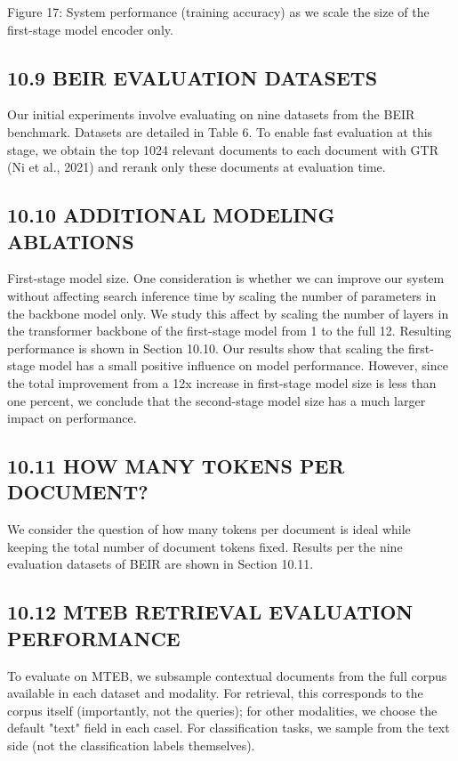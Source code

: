 \begin{tabular}
{Figure 17: System performance (training accuracy) as we scale the size of the first-stage model encoder only.
\subsection*{10.9 BEIR EVALUATION DATASETS}
Our initial experiments involve evaluating on nine datasets from the BEIR benchmark. Datasets are detailed in Table 6. To enable fast evaluation at this stage, we obtain the top 1024 relevant documents to each document with GTR (Ni et al., 2021) and rerank only these documents at evaluation time.
\subsection*{10.10 ADDITIONAL MODELING ABLATIONS}
First-stage model size. One consideration is whether we can improve our system without affecting search inference time by scaling the number of parameters in the backbone model only. We study this affect by scaling the number of layers in the transformer backbone of the first-stage model from 1 to the full 12. Resulting performance is shown in Section 10.10.
Our results show that scaling the first-stage model has a small positive influence on model performance. However, since the total improvement from a 12x increase in first-stage model size is less than one percent, we conclude that the second-stage model size has a much larger impact on performance.
\subsection*{10.11 HOW MANY TOKENS PER DOCUMENT?}
We consider the question of how many tokens per document is ideal while keeping the total number of document tokens fixed. Results per the nine evaluation datasets of BEIR are shown in Section 10.11.
\subsection*{10.12 MTEB RETRIEVAL EVALUATION PERFORMANCE}
To evaluate on MTEB, we subsample contextual documents from the full corpus available in each dataset and modality. For retrieval, this corresponds to the corpus itself (importantly, not the queries); for other modalities, we choose the default "text" field in each casel. For classification tasks, we sample from the text side (not the classification labels themselves).

}
\end{tabular}
